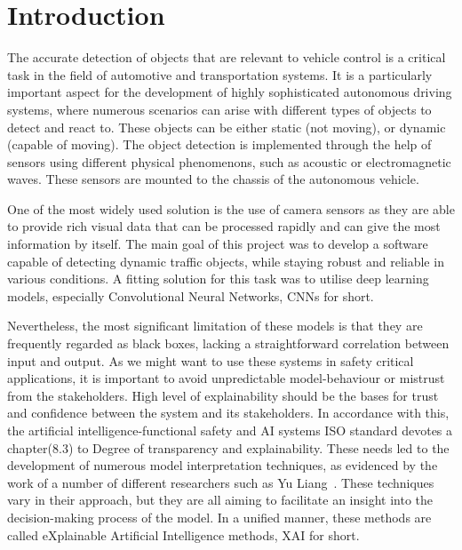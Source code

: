 
\section{Introduction}\label{sec:introduction}

The accurate detection of objects that are relevant to vehicle control is a critical task in the field of automotive and transportation systems.
It is a particularly important aspect for the development of highly sophisticated autonomous driving systems, where numerous scenarios can arise with different types of objects to detect and react to.
These objects can be either static (not moving), or dynamic (capable of moving).
The object detection is implemented through the help of sensors using different physical phenomenons, such as acoustic or electromagnetic waves.
These sensors are mounted to the chassis of the autonomous vehicle.

One of the most widely used solution is the use of camera sensors as they are able to
provide rich visual data that can be processed rapidly and can give the most information by itself.
The main goal of this project was to develop a software capable of detecting dynamic traffic
objects, while staying robust and reliable in various conditions.
A fitting solution for this task was to utilise deep learning models, especially Convolutional Neural Networks, CNNs for short.

Nevertheless, the most significant limitation of these models is that they are frequently regarded as black boxes, lacking a straightforward correlation between input and output.
As we might want to use these systems in safety critical applications,
it is important to avoid unpredictable model-behaviour or mistrust from the stakeholders.
High level of explainability should be the bases for trust and confidence between the system and its stakeholders.
In accordance with this, the artificial intelligence-functional safety and AI systems ISO standard\cite{ISO5469:2021} devotes a chapter(8.3) to
Degree of transparency and explainability.
These needs led to the development of numerous model interpretation techniques,
as evidenced by the work of a number of different researchers such as Yu Liang~\cite{LIANG2021168}.
These techniques vary in their approach, but they are all aiming to facilitate an insight into the decision-making process of the model.
In a unified manner, these methods are called eXplainable Artificial Intelligence methods, XAI for short.


